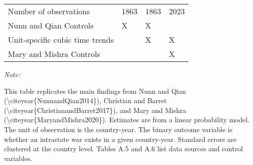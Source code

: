 \begin{table}
\begin{threeparttable}
\begin{tabular}[t]{llll}
\midrule
Number of observations & 1863 & 1863 & 2023\\
Nunn and Qian Controls & X & X & \\
Unit-specific cubic time trends &  & X & X\\
Mary and Mishra Controls &  &  & X\\
\bottomrule
\end{tabular}
\begin{tablenotes}[para]
\item \textit{Note: } 
\item This table replicates the main findings from Nunn and Qian (\textbackslash{}citeyear\{NunnandQian2014\}), Christian and Barret (\textbackslash{}citeyear\{ChristianandBarret2017\}), and Mary and Mishra (\textbackslash{}citeyear\{MaryandMishra2020\}). Estimates are from a linear probability model. The unit of observation is the country-year. The binary outcome variable is whether an intrastate war exists in a given country-year. Standard errors are clustered at the country level. Tables A.5 and A.6 list data sources and control variables. 
\end{tablenotes}
\end{threeparttable}
\end{table}
